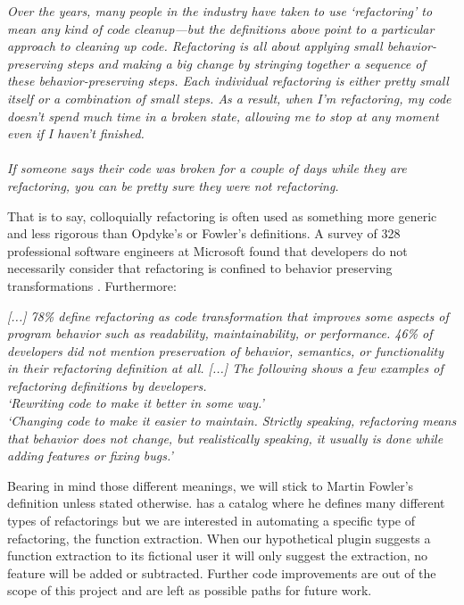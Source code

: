 \begin{myquote}
\textit{Over the years, many people in the industry have taken to use `refactoring' to mean any kind of code cleanup---but the definitions above point to a particular approach to cleaning up code. Refactoring is all about applying small behavior-preserving steps and
making a big change by stringing together a sequence of these behavior-preserving steps. Each individual refactoring is either pretty small itself or a combination of small steps. As a result, when I'm refactoring, my code doesn't spend much time in a broken state, allowing me to stop at any moment even if I haven't finished.}
\\
\\
\textit{If someone says their code was broken for a couple of days while they are
refactoring, you can be pretty sure they were not refactoring.}\\\citet{martinfowler}
\end{myquote}








That is to say, colloquially refactoring is often used as something more generic and less rigorous than Opdyke's or Fowler's definitions.
A survey of 328 professional software engineers at Microsoft found that developers do not necessarily consider that refactoring is confined to behavior preserving transformations \citep{7vista}. Furthermore: \begin{myquote}
\textit{[...] 78\% define refactoring as code transformation that improves some aspects of program behavior
such as readability, maintainability, or performance. 46\%
of developers did not mention preservation of behavior,
semantics, or functionality in their refactoring definition
at all. [...]
The following shows a few examples of refactoring
definitions by developers.
\\
\qquad `Rewriting code to make it better in some way.'
\\
\qquad `Changing code to make it easier to maintain. Strictly
speaking, refactoring means that behavior does not change,
but realistically speaking, it usually is done while adding
features or fixing bugs.'} 
\\
\citet{7vista} \end{myquote}


Bearing in mind those different meanings, we will stick to Martin Fowler's definition unless stated otherwise. \citet{catalog} has a catalog where he defines many different types of refactorings but we are interested in automating a specific type of refactoring, the function extraction. When our hypothetical plugin suggests a function extraction to its fictional user it will only suggest the extraction, no feature will be added or subtracted. Further code improvements are out of the scope of this project and are left as possible paths for future work.





